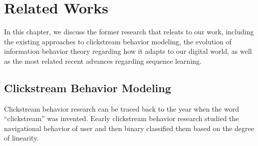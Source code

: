 \section{Related Works}
\label{ch:relate}


In this chapter, we discuss the former research that releats to our work, including
the existing approaches to clickstream behavior modeling, the evolution of information 
behavior theory regarding how it adapts to our digital world, as well as the 
most related recent advances regarding sequence learning.

\subsection{Clickstream Behavior Modeling}

Clickstream behavior research can be traced back to the year when the word ``clickstream''
was invented. Eearly clickstream behavior research studied the navigational behavior
of user \cite{mandese1995clickstreams, brodwin1995} and then binary classified them based on the degree of linearity.







